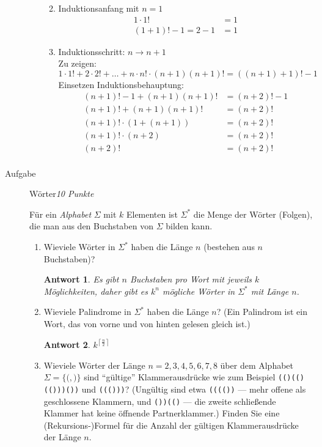\documentclass[a4paper,twoside,12pt,fleqn]{article}
\newcounter{AUFGNR}
\newcommand{\AUFGABE}[2]{\vspace{0.3cm}\item[Aufgabe~\arabic{AUFGNR}]\stepcounter{AUFGNR} #1\hfill\emph{#2}}
\newcommand{\ceil}[1]{\left\lceil{#1}\right\rceil}
\newtheorem*{antwort}{Antwort}
\begin{document}
\begin{description}
\begin{enumerate}
\begin{enumerate}
\[      \]
      \item Induktionsanfang mit $n = 1$
      \begin{align*}
        1 \cdot 1! &= 1\\
        (1+1)!-1 = 2-1 &= 1
      \end{align*}
      \item Induktionsschritt: $n \rightarrow n + 1$\\
      Zu zeigen: $1\cdot 1! + 2 \cdot 2! + \dots + n \cdot n! \cdot (n+1)(n+1)!
      = ((n+1)+1)!-1$\\
      Einsetzen Induktionsbehauptung:\\
      \begin{align*}
        (n+1)!-1 + (n+1)(n+1)!   &= (n+2)!-1\\
        (n+1)!   + (n+1)(n+1)!   &= (n+2)!\\
        (n+1)! \cdot (1 + (n+1)) &= (n+2)!\\
        (n+1)! \cdot (n+2)       &= (n+2)!\\
        (n+2)!                   &= (n+2)!\\
      \end{align*}
    \end{enumerate}
\end{enumerate}

\AUFGABE{W\"orter}{10 Punkte}

 F\"ur ein \emph{Alphabet} $\Sigma$ mit $k$ Elementen
  ist  $\Sigma^*$ die Menge der W\"orter (Folgen), die
  man aus den Buchstaben von $\Sigma$ bilden kann.
\begin{enumerate}
  \item Wieviele W\"orter in $\Sigma^*$ haben die
    L\"ange $n$ (bestehen aus $n$ Buchstaben)?
    \begin{antwort}
      Es gibt $n$ Buchstaben pro Wort mit jeweils $k$ M\"oglichkeiten, daher gibt
      es $k^n$ m\"ogliche W\"orter in $\Sigma^*$ mit L\"ange $n$.
    \end{antwort}

  \item Wieviele Palindrome in $\Sigma^*$ haben die L\"ange $n$?
(Ein Palindrom ist ein Wort, das von vorne und von hinten gelesen
gleich ist.)
    \begin{antwort}
      $k^{\ceil{\frac{n}{2}}}$
    \end{antwort}
  \item Wieviele W\"orter der L\"ange $n=2,3,4,5,6,7,8$ \"uber dem Alphabet
  $\Sigma = \{\texttt{(},\texttt{)}\}$ sind ``g\"ultige''
  Klammerausdr\"ucke wie zum Beispiel \texttt{(()(()(()))())} und
  \texttt{((()))}? (Un\-g\"ul\-tig sind etwa
  \texttt{(((())} --- mehr offene als geschlossene Klammern, und
  \texttt{())(()} --- die zweite schlie\ss{}ende Klammer hat keine
   \"offnende Partnerklammer.)
   Finden Sie eine (Rekursions-)Formel f\"ur die Anzahl
   der g\"ultigen Klammerausdr\"ucke der L\"ange $n$.
\end{enumerate}


\end{description}
\end{document}
